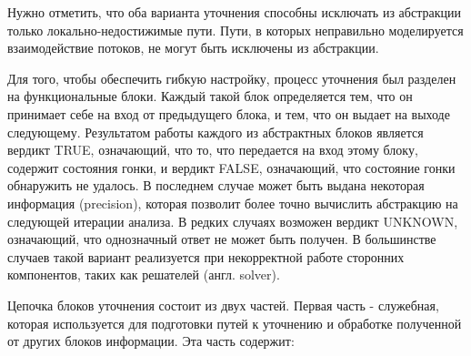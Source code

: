 Нужно отметить, что оба варианта уточнения способны исключать из абстракции только локально-недостижимые пути.
Пути, в которых неправильно моделируется взаимодействие потоков, не могут быть исключены из абстракции.

Для того, чтобы обеспечить гибкую настройку, процесс уточнения был разделен на функциональные блоки.
Каждый такой блок определяется тем, что он принимает себе на вход от предыдущего блока, и тем, что он выдает на выходе следующему.
Результатом работы каждого из абстрактных блоков является вердикт TRUE, означающий, что то, что передается на вход этому блоку, содержит состояния гонки, и вердикт FALSE, означающий, что состояние гонки обнаружить не удалось.
В последнем случае может быть выдана некоторая информация (precision), которая позволит более точно вычислить абстракцию на следующей итерации анализа.
В редких случаях возможен вердикт UNKNOWN, означающий, что однозначный ответ не может быть получен. 
В большинстве случаев такой вариант реализуется при некорректной работе сторонних компонентов, таких как решателей (англ. solver).

Цепочка блоков уточнения состоит из двух частей. Первая часть - служебная, которая используется для подготовки путей к уточнению и обработке полученной от других блоков информации. Эта часть содержит:

